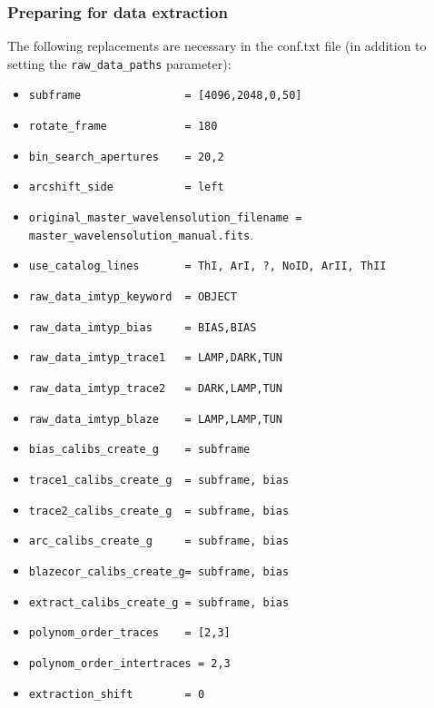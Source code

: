\documentclass[10pt,a4paper]{article}
\begin{document}
\subsubsection{Preparing for data extraction}

\noindent The following replacements are necessary in the conf.txt file (in addition to setting the \verb|raw_data_paths| parameter):
\begin{itemize}\small\setlength\itemsep{-0.1cm}
  \small
  \item \verb|subframe                = [4096,2048,0,50]|
  \item \verb|rotate_frame            = 180|
  \item \verb|bin_search_apertures    = 20,2|
  \item \verb|arcshift_side           = left|
  \item \verb|original_master_wavelensolution_filename = master_wavelensolution_manual.fits|.
  \item \verb|use_catalog_lines 	  = ThI, ArI, ?, NoID, ArII, ThII|
  \item \verb|raw_data_imtyp_keyword  = OBJECT|
  \item \verb|raw_data_imtyp_bias     = BIAS,BIAS|
  \item \verb|raw_data_imtyp_trace1   = LAMP,DARK,TUN|
  \item \verb|raw_data_imtyp_trace2   = DARK,LAMP,TUN|
  \item \verb|raw_data_imtyp_blaze    = LAMP,LAMP,TUN|
  \item \verb|bias_calibs_create_g    = subframe|
  \item \verb|trace1_calibs_create_g  = subframe, bias|
  \item \verb|trace2_calibs_create_g  = subframe, bias|
  \item \verb|arc_calibs_create_g     = subframe, bias|
  \item \verb|blazecor_calibs_create_g= subframe, bias|
  \item \verb|extract_calibs_create_g = subframe, bias|
  \item \verb|polynom_order_traces    = [2,3]|
  \item \verb|polynom_order_intertraces = 2,3|
  \item \verb|extraction_shift        = 0|
\end{itemize}
\end{document}
